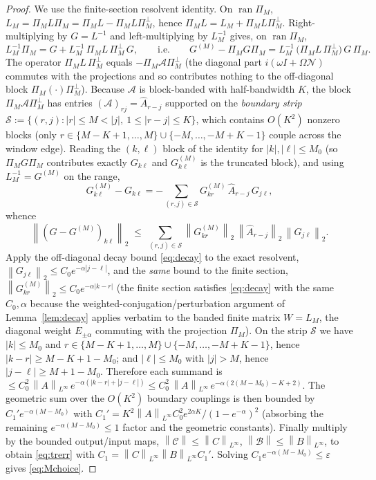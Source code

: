 \documentclass{amsart}
\theoremstyle{definition}
\newcommand{\norm}[1]{\left\lVert#1\right\rVert}
\newcommand{\Acal}{\mathcal{A}}
\newcommand{\Bcal}{\mathcal{B}}
\newcommand{\Ccal}{\mathcal{C}}
\newcommand{\Ncal}{\mathcal{N}}
\begin{document}
\begin{proof}
We use the finite-section resolvent identity. On $\operatorname{ran}\Pi_M$,
$L_M = \Pi_M L \Pi_M = \Pi_M L - \Pi_M L \Pi_M^\perp$, hence
$\Pi_M L = L_M + \Pi_M L \Pi_M^\perp$. Right-multiplying by $G=L^{-1}$ and
left-multiplying by $L_M^{-1}$ gives, on $\operatorname{ran}\Pi_M$,
\[
L_M^{-1}\Pi_M = G + L_M^{-1}\,\Pi_M L\,\Pi_M^\perp\,G ,
\qquad\text{i.e.}\qquad
G^{(M)}-\Pi_M G\Pi_M
= L_M^{-1}\,\big(\Pi_M L\,\Pi_M^\perp\big)\,G\,\Pi_M .
\]
The operator $\Pi_M L\,\Pi_M^\perp$ equals $-\Pi_M\Acal\Pi_M^\perp$ (the
diagonal part $i(\omega I+\Omega\Ncal)$ commutes with the projections and so
contributes nothing to the off-diagonal block $\Pi_M(\cdot)\Pi_M^\perp$).
Because $\Acal$ is block-banded with half-bandwidth $K$, the block
$\Pi_M\Acal\Pi_M^\perp$ has entries $(\Acal)_{rj}=\hat A_{r-j}$ supported on the
\emph{boundary strip}
$\mathcal S:=\{(r,j): |r|\le M<|j|,\ 1\le |r-j|\le K\}$, which contains $O(K^2)$
nonzero blocks (only $r\in\{M-K+1,\dots,M\}\cup\{-M,\dots,-M+K-1\}$ couple
across the window edge). Reading the $(k,\ell)$ block of the identity for
$|k|,|\ell|\le M_0$ (so $\Pi_M G\Pi_M$ contributes exactly $G_{k\ell}$ and
$G^{(M)}_{k\ell}$ is the truncated block), and using
$L_M^{-1}=G^{(M)}$ on the range,
\[
G^{(M)}_{k\ell}-G_{k\ell}
= -\sum_{(r,j)\in\mathcal S} G^{(M)}_{kr}\,\hat A_{r-j}\,G_{j\ell},
\]
whence
\[
\norm{(G-G^{(M)})_{k\ell}}_2
\;\le\; \sum_{(r,j)\in\mathcal S}
\norm{G^{(M)}_{kr}}_2\,\norm{\hat A_{r-j}}_2\,\norm{G_{j\ell}}_2 .
\]
Apply the off-diagonal decay bound \eqref{eq:decay} to the exact resolvent,
$\norm{G_{j\ell}}_2\le C_0 e^{-\alpha|j-\ell|}$, and the \emph{same} bound to the
finite section, $\norm{G^{(M)}_{kr}}_2\le C_0 e^{-\alpha|k-r|}$ (the finite
section satisfies \eqref{eq:decay} with the same $C_0,\alpha$ because the
weighted-conjugation/perturbation argument of Lemma~\ref{lem:decay} applies
verbatim to the banded finite matrix $W=L_M$, the diagonal weight $E_{\pm\alpha}$
commuting with the projection $\Pi_M$). On the strip $\mathcal S$ we have
$|k|\le M_0$ and $r\in\{M-K+1,\dots,M\}\cup\{-M,\dots,-M+K-1\}$, hence
$|k-r|\ge M-K+1-M_0$; and $|\ell|\le M_0$ with $|j|>M$, hence
$|j-\ell|\ge M+1-M_0$. Therefore each summand is
$\le C_0^2\,\norm{A}_{L^\infty}\,e^{-\alpha(|k-r|+|j-\ell|)}
\le C_0^2\,\norm{A}_{L^\infty}\,e^{-\alpha(2(M-M_0)-K+2)}$. The
geometric sum over the $O(K^2)$ boundary couplings is then bounded by
$C_1' e^{-\alpha(M-M_0)}$ with
$C_1'=K^2\norm{A}_{L^\infty}C_0^2 e^{2\alpha K}/(1-e^{-\alpha})^2$
(absorbing the remaining $e^{-\alpha(M-M_0)}\le 1$ factor and the geometric
constants). Finally
multiply by the bounded output/input maps,
$\norm{\Ccal}\le\norm{C}_{L^\infty}$, $\norm{\Bcal}\le\norm{B}_{L^\infty}$,
to obtain \eqref{eq:trerr} with
$C_1=\norm{C}_{L^\infty}\norm{B}_{L^\infty}C_1'$. Solving
$C_1 e^{-\alpha(M-M_0)}\le\varepsilon$ gives \eqref{eq:Mchoice}.
\end{proof}
\end{document}
